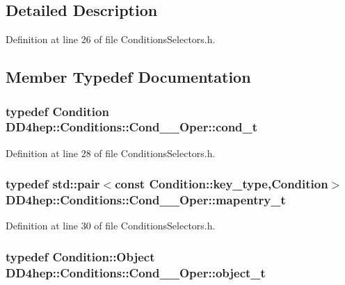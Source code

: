 \subsection{Detailed Description}


Definition at line 26 of file ConditionsSelectors.h.

\subsection{Member Typedef Documentation}
\hypertarget{class_d_d4hep_1_1_conditions_1_1_cond_____oper_aceca9f6a0e8c84364946eace47275d09}{
\subsubsection[{cond\_\-t}]{\setlength{\rightskip}{0pt plus 5cm}typedef {\bf Condition} {\bf DD4hep::Conditions::Cond\_\-\_\-Oper::cond\_\-t}}}
\label{class_d_d4hep_1_1_conditions_1_1_cond_____oper_aceca9f6a0e8c84364946eace47275d09}


Definition at line 28 of file ConditionsSelectors.h.\hypertarget{class_d_d4hep_1_1_conditions_1_1_cond_____oper_a877dac3da66795207aed15be219acbdc}{
\subsubsection[{mapentry\_\-t}]{\setlength{\rightskip}{0pt plus 5cm}typedef std::pair$<$const {\bf Condition::key\_\-type},{\bf Condition}$>$ {\bf DD4hep::Conditions::Cond\_\-\_\-Oper::mapentry\_\-t}}}
\label{class_d_d4hep_1_1_conditions_1_1_cond_____oper_a877dac3da66795207aed15be219acbdc}


Definition at line 30 of file ConditionsSelectors.h.\hypertarget{class_d_d4hep_1_1_conditions_1_1_cond_____oper_a4229491e49bfd21058dff10125a73f63}{
\subsubsection[{object\_\-t}]{\setlength{\rightskip}{0pt plus 5cm}typedef {\bf Condition::Object} {\bf DD4hep::Conditions::Cond\_\-\_\-Oper::object\_\-t}}}
\label{class_d_d4hep_1_1_conditions_1_1_cond_____oper_a4229491e49bfd21058dff10125a73f63}


